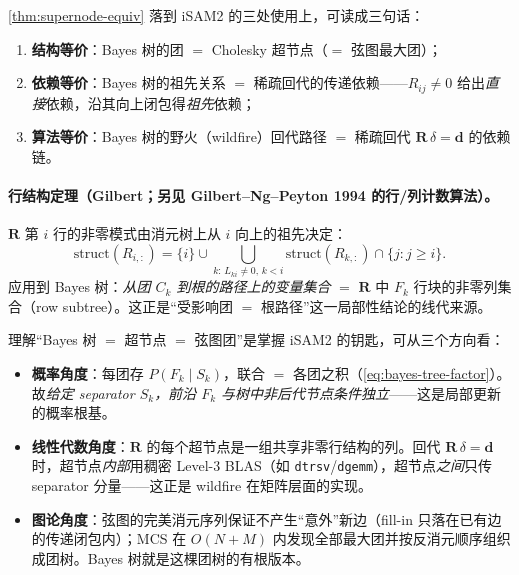 \cref{thm:supernode-equiv} 落到 iSAM2 的三处使用上，可读成三句话：
\begin{enumerate}
  \item \textbf{结构等价}：Bayes 树的团 $=$ Cholesky 超节点（$=$ 弦图最大团）；
  \item \textbf{依赖等价}：Bayes 树的祖先关系 $=$ 稀疏回代的传递依赖——$R_{ij}\neq 0$ 给出\emph{直接}依赖，沿其向上闭包得\emph{祖先}依赖；
  \item \textbf{算法等价}：Bayes 树的野火（wildfire）回代路径 $=$ 稀疏回代 $\mathbf{R}\,\delta=\mathbf{d}$ 的依赖链。
\end{enumerate}

\paragraph{行结构定理（Gilbert\cite{gilbert1994predicting}；另见 Gilbert--Ng--Peyton 1994 的行/列计数算法）。}
$\mathbf{R}$ 第 $i$ 行的非零模式由消元树上从 $i$ 向上的祖先决定：
\begin{equation}
  \mathrm{struct}(R_{i,:})=\{i\}\cup\bigcup_{k:\,L_{ki}\neq 0,\,k<i}\mathrm{struct}(R_{k,:})\cap\{j:j\ge i\}.
  \label{eq:row-struct}
\end{equation}
应用到 Bayes 树：\emph{从团 $C_k$ 到根的路径上的变量集合} $=$ $\mathbf{R}$ 中 $F_k$ 行块的非零列集合（row subtree）。这正是“受影响团 $=$ 根路径”这一局部性结论的线代来源。

\begin{insight}[等价性的三重解读]
理解“Bayes 树 $=$ 超节点 $=$ 弦图团”是掌握 iSAM2 的钥匙，可从三个方向看：
\begin{itemize}
  \item \textbf{概率角度}：每团存 $P(F_k\mid S_k)$，联合 $=$ 各团之积（\cref{eq:bayes-tree-factor}）。故\emph{给定 separator $S_k$，前沿 $F_k$ 与树中非后代节点条件独立}——这是局部更新的概率根基。
  \item \textbf{线性代数角度}：$\mathbf{R}$ 的每个超节点是一组共享非零行结构的列。回代 $\mathbf{R}\,\delta=\mathbf{d}$ 时，超节点\emph{内部}用稠密 Level-3 BLAS（如 \texttt{dtrsv}/\texttt{dgemm}），超节点\emph{之间}只传 separator 分量——这正是 wildfire 在矩阵层面的实现。
  \item \textbf{图论角度}：弦图的完美消元序列保证不产生“意外”新边（fill-in 只落在已有边的传递闭包内）；MCS 在 $O(N+M)$ 内发现全部最大团并按反消元顺序组织成团树。Bayes 树就是这棵团树的有根版本。
\end{itemize}
\end{insight}

